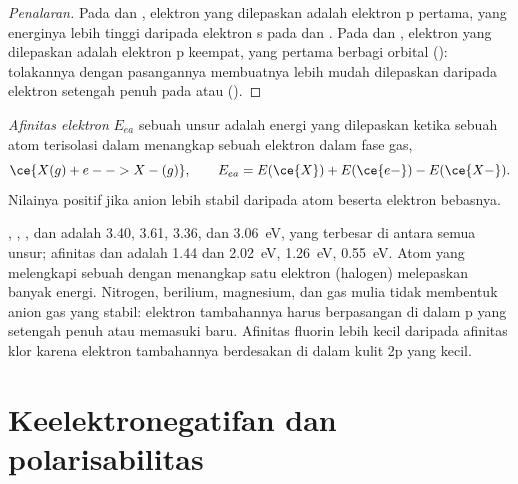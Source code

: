 \begin{proof}[Penalaran]
Pada  dan , elektron yang dilepaskan adalah elektron p
pertama, yang energinya lebih tinggi daripada elektron s pada 
dan . Pada  dan , elektron yang dilepaskan adalah
elektron p keempat, yang pertama berbagi orbital ():
tolakannya dengan pasangannya membuatnya lebih mudah dilepaskan daripada
elektron  setengah penuh pada  atau 
().
\end{proof}

\begin{definition}\label{def:b1:periodicity:electron-affinity}
\emph{Afinitas elektron} $E_{ea}$ sebuah unsur
adalah energi yang dilepaskan ketika sebuah atom terisolasi dalam
 menangkap sebuah elektron dalam fase gas,
\[
  \ce{X(g) + e- -> X-(g)}, \qquad E_{ea} = E(\ce{X}) + E(\ce{e-}) - E(\ce{X-}) .
\]
Nilainya positif jika anion lebih stabil daripada atom beserta elektron
bebasnya.
\end{definition}

\begin{example}\label{ex:b1:periodicity:ea}
 , , , dan  adalah 3.40, 3.61,
3.36, dan \qty{3.06}{eV}, yang terbesar di antara semua unsur; afinitas
 dan  adalah 1.44 dan \qty{2.02}{eV},  \qty{1.26}{eV},
 \qty{0.55}{eV}. Atom yang melengkapi sebuah  dengan
menangkap satu elektron (halogen) melepaskan banyak energi. Nitrogen,
berilium, magnesium, dan gas mulia tidak membentuk anion gas yang stabil:
elektron tambahannya harus berpasangan di dalam  p yang setengah
penuh atau memasuki  baru. Afinitas fluorin lebih kecil daripada
afinitas klor karena elektron tambahannya berdesakan di dalam kulit 2p
yang kecil.
\end{example}

\section{Keelektronegatifan dan polarisabilitas}

